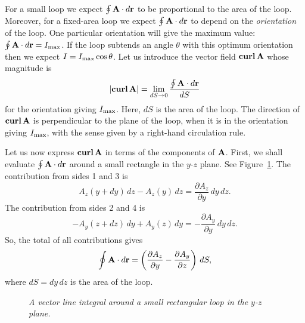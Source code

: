 For a small loop we expect $\oint {\bf A}\cdot d{\bf r}$ to be proportional to
the area of the loop. Moreover, for a fixed-area loop  we expect
$\oint {\bf A}\cdot d{\bf r}$ to depend on the {\em orientation}\/ of the loop.
One particular orientation will give the maximum value: $\oint {\bf A}\cdot d{\bf r}
= I_{\rm max}$. If the loop subtends an angle $\theta$ with this optimum orientation
then we expect $I= I_{\rm max}\cos\theta$. Let us introduce the vector field
${\bf curl}\,{\bf A}$ whose magnitude is
\begin{equation}
|{\bf curl}\,{\bf A}| = \lim_{dS\rightarrow 0}\frac{\oint {\bf A}\cdot
d{\bf r}}{dS}
\end{equation}
for the orientation giving $I_{\rm max}$. Here, $dS$ is the area of the loop.
The direction of ${\bf curl}\,{\bf A}$ is perpendicular to the plane of the loop,
 when it is
 in the 
orientation giving $I_{\rm max}$, with the sense given by a right-hand circulation rule.

Let us now express ${\bf curl}\,{\bf A}$ in terms of the components of ${\bf A}$.
First, we shall
 evaluate $\oint {\bf A}\cdot d{\bf r}$ around a small rectangle in the
$y$-$z$ plane. See Figure~\ref{f21}.
The contribution from sides 1 and 3 is
\begin{equation}
A_z(y+dy)\,dz - A_z(y)\,dz = \frac{\partial A_z}{\partial y} \,dy\,dz.
\end{equation}
The contribution from sides 2 and 4 is
\begin{equation}
-A_y(z+dz)\,dy + A_y(z)\,dy = -\frac{\partial A_y}{\partial y}\,dy\,dz.
\end{equation}
So, the total of all contributions gives
\begin{equation}
\oint {\bf A}\cdot d{\bf r} = \left(\frac{\partial A_z}{\partial y}-
\frac{\partial A_y}{\partial z}\right)\,dS,
\end{equation}
where $dS=dy\,dz$ is the area of the loop. 
\begin{figure}
\epsfysize=2in
\centerline{}
\caption{\em A vector line integral around a small rectangular loop in the $y$-$z$ plane.}\label{f21}
\end{figure}

